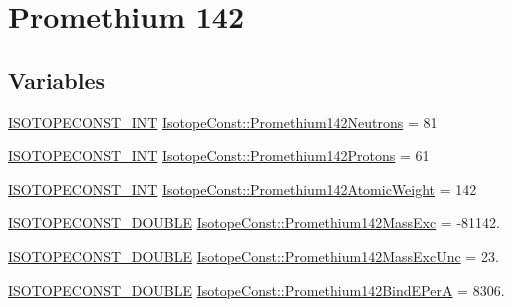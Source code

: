 \hypertarget{group___isotope_const-_promethium-_pm142}{}\section{Promethium 142}
\label{group___isotope_const-_promethium-_pm142}
\subsection*{Variables}
\begin{DoxyCompactItemize}
\item 
\mbox{\hyperlink{group___isotope_const-_macros_ga5f18360b3e99483a35c32d789e62621c}{I\+S\+O\+T\+O\+P\+E\+C\+O\+N\+S\+T\+\_\+\+I\+NT}} \mbox{\hyperlink{group___isotope_const-_promethium-_pm142_gaf008044d2bc69100e66d027e7975a8a1}{Isotope\+Const\+::\+Promethium142\+Neutrons}} = 81
\item 
\mbox{\hyperlink{group___isotope_const-_macros_ga5f18360b3e99483a35c32d789e62621c}{I\+S\+O\+T\+O\+P\+E\+C\+O\+N\+S\+T\+\_\+\+I\+NT}} \mbox{\hyperlink{group___isotope_const-_promethium-_pm142_ga6d5c70a2085c30cbdf4f6b7274381a3b}{Isotope\+Const\+::\+Promethium142\+Protons}} = 61
\item 
\mbox{\hyperlink{group___isotope_const-_macros_ga5f18360b3e99483a35c32d789e62621c}{I\+S\+O\+T\+O\+P\+E\+C\+O\+N\+S\+T\+\_\+\+I\+NT}} \mbox{\hyperlink{group___isotope_const-_promethium-_pm142_gac099bb72c5ac9bc26178e7ddf595bc26}{Isotope\+Const\+::\+Promethium142\+Atomic\+Weight}} = 142
\item 
\mbox{\hyperlink{group___isotope_const-_macros_ga8f45a7272ce02c0b4c65c44636ed719a}{I\+S\+O\+T\+O\+P\+E\+C\+O\+N\+S\+T\+\_\+\+D\+O\+U\+B\+LE}} \mbox{\hyperlink{group___isotope_const-_promethium-_pm142_gaeba01f88e59dbd5a0435740e840bbbba}{Isotope\+Const\+::\+Promethium142\+Mass\+Exc}} = -\/81142.
\item 
\mbox{\hyperlink{group___isotope_const-_macros_ga8f45a7272ce02c0b4c65c44636ed719a}{I\+S\+O\+T\+O\+P\+E\+C\+O\+N\+S\+T\+\_\+\+D\+O\+U\+B\+LE}} \mbox{\hyperlink{group___isotope_const-_promethium-_pm142_ga35f31e84e04dd6bc36f4bd9fa1c4de29}{Isotope\+Const\+::\+Promethium142\+Mass\+Exc\+Unc}} = 23.
\item 
\mbox{\hyperlink{group___isotope_const-_macros_ga8f45a7272ce02c0b4c65c44636ed719a}{I\+S\+O\+T\+O\+P\+E\+C\+O\+N\+S\+T\+\_\+\+D\+O\+U\+B\+LE}} \mbox{\hyperlink{group___isotope_const-_promethium-_pm142_ga0f23a2aebf2203f81731d389f99f14aa}{Isotope\+Const\+::\+Promethium142\+Bind\+E\+PerA}} = 8306.

\end{DoxyCompactItemize}
